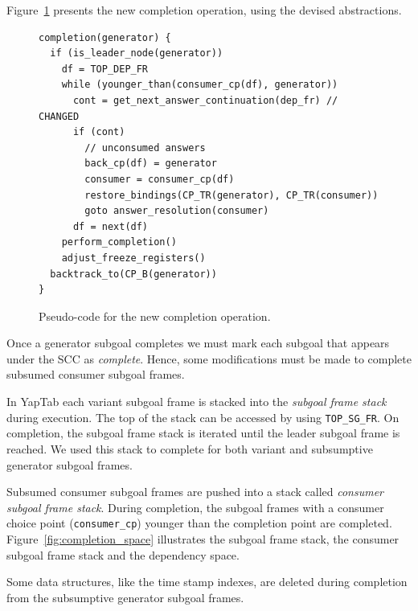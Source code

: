 Figure~\ref{fig:completion_operation} presents the new completion operation,
using the devised abstractions.

\begin{figure}[ht]
\begin{Verbatim}
completion(generator) {
  if (is_leader_node(generator))
    df = TOP_DEP_FR
    while (younger_than(consumer_cp(df), generator))
      cont = get_next_answer_continuation(dep_fr) // CHANGED
      if (cont)
        // unconsumed answers
        back_cp(df) = generator
        consumer = consumer_cp(df)
        restore_bindings(CP_TR(generator), CP_TR(consumer))
        goto answer_resolution(consumer)
      df = next(df)
    perform_completion()
    adjust_freeze_registers()
  backtrack_to(CP_B(generator))
}
\end{Verbatim}
\caption{Pseudo-code for the new completion operation.}
\label{fig:completion_operation}
\end{figure}

Once a generator subgoal completes we must mark each subgoal that appears under the SCC as \textit{complete}.
Hence, some modifications must be made to complete subsumed consumer subgoal frames.

In YapTab each variant subgoal frame is stacked into the \textit{subgoal frame stack} during execution.
The top of the stack can be accessed by using \texttt{TOP\_SG\_FR}.  On completion, the subgoal frame
stack is iterated until the leader subgoal frame is reached. We used this stack to complete for both
variant and subsumptive generator subgoal frames.

Subsumed consumer subgoal frames are pushed into a stack called \textit{consumer subgoal frame stack}.
During completion, the subgoal frames with a consumer choice point (\texttt{consumer\_cp})
younger than the completion point are completed. Figure~\ref{fig:completion_space} illustrates the
subgoal frame stack, the consumer subgoal frame stack and the dependency space.

Some data structures, like the time stamp indexes, are deleted during completion from the
subsumptive generator subgoal frames.

